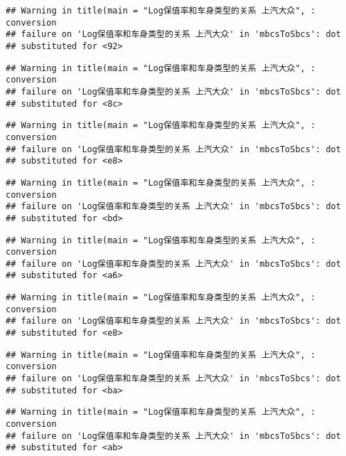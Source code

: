 \documentclass[]{article}
\begin{document}
\begin{verbatim}
## Warning in title(main = "Log保值率和车身类型的关系 上汽大众", : conversion
## failure on 'Log保值率和车身类型的关系 上汽大众' in 'mbcsToSbcs': dot
## substituted for <92>
\end{verbatim}

\begin{verbatim}
## Warning in title(main = "Log保值率和车身类型的关系 上汽大众", : conversion
## failure on 'Log保值率和车身类型的关系 上汽大众' in 'mbcsToSbcs': dot
## substituted for <8c>
\end{verbatim}

\begin{verbatim}
## Warning in title(main = "Log保值率和车身类型的关系 上汽大众", : conversion
## failure on 'Log保值率和车身类型的关系 上汽大众' in 'mbcsToSbcs': dot
## substituted for <e8>
\end{verbatim}

\begin{verbatim}
## Warning in title(main = "Log保值率和车身类型的关系 上汽大众", : conversion
## failure on 'Log保值率和车身类型的关系 上汽大众' in 'mbcsToSbcs': dot
## substituted for <bd>
\end{verbatim}

\begin{verbatim}
## Warning in title(main = "Log保值率和车身类型的关系 上汽大众", : conversion
## failure on 'Log保值率和车身类型的关系 上汽大众' in 'mbcsToSbcs': dot
## substituted for <a6>
\end{verbatim}

\begin{verbatim}
## Warning in title(main = "Log保值率和车身类型的关系 上汽大众", : conversion
## failure on 'Log保值率和车身类型的关系 上汽大众' in 'mbcsToSbcs': dot
## substituted for <e8>
\end{verbatim}

\begin{verbatim}
## Warning in title(main = "Log保值率和车身类型的关系 上汽大众", : conversion
## failure on 'Log保值率和车身类型的关系 上汽大众' in 'mbcsToSbcs': dot
## substituted for <ba>
\end{verbatim}

\begin{verbatim}
## Warning in title(main = "Log保值率和车身类型的关系 上汽大众", : conversion
## failure on 'Log保值率和车身类型的关系 上汽大众' in 'mbcsToSbcs': dot
## substituted for <ab>
\end{verbatim}
\end{document}
